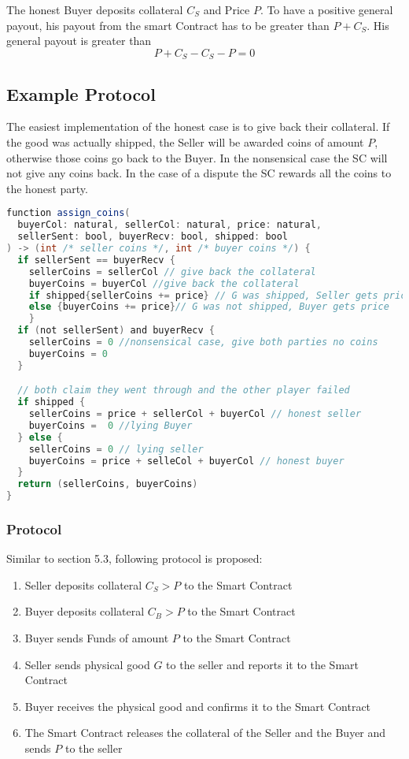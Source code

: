 \documentclass{cacthesis}
\begin{document}
The honest Buyer deposits collateral $C_S$ and Price $P$. To have a positive general payout, his payout from the smart Contract has to be greater than $P + C_S$. His general payout is greater than
\[P + C_S - C_S - P = 0\]

\subsection{Example Protocol}
The easiest implementation of the honest case is to give back their collateral. If the good was actually shipped, the Seller will be awarded coins of amount $P$, otherwise those coins go back to the Buyer.\newline
In the nonsensical case the SC will not give any coins back.\newline
In the case of a dispute the SC rewards all the coins to the honest party.

\begin{lstlisting}[language=java]
function assign_coins(
  buyerCol: natural, sellerCol: natural, price: natural,
  sellerSent: bool, buyerRecv: bool, shipped: bool
) -> (int /* seller coins */, int /* buyer coins */) {
  if sellerSent == buyerRecv { 
    sellerCoins = sellerCol // give back the collateral
    buyerCoins = buyerCol //give back the collateral
    if shipped{sellerCoins += price} // G was shipped, Seller gets price
    else {buyerCoins += price}// G was not shipped, Buyer gets price
    }
  if (not sellerSent) and buyerRecv { 
    sellerCoins = 0 //nonsensical case, give both parties no coins
    buyerCoins = 0
  }

  // both claim they went through and the other player failed
  if shipped {
    sellerCoins = price + sellerCol + buyerCol // honest seller
    buyerCoins =  0 //lying Buyer
  } else {
    sellerCoins = 0 // lying seller
    buyerCoins = price + selleCol + buyerCol // honest buyer
  }
  return (sellerCoins, buyerCoins)
}
\end{lstlisting}

\subsubsection{Protocol}
Similar to section 5.3, following protocol is proposed:
\begin{enumerate}
    \item Seller deposits collateral $C_S > P$ to the Smart Contract
    \item Buyer deposits collateral $C_B > P$ to the Smart Contract
    \item Buyer sends Funds of amount $P$ to the Smart Contract
    \item Seller sends physical good $G$ to the seller and reports it to the Smart Contract
    \item Buyer receives the physical good and confirms it to the Smart Contract
    \item The Smart Contract releases the collateral of the Seller and the Buyer and sends $P$ to the seller
\end{enumerate}
\end{document}
